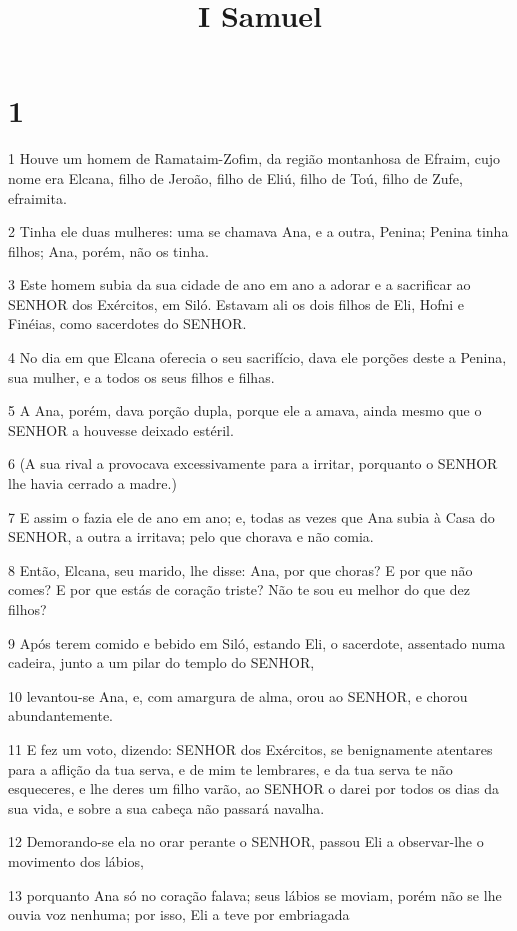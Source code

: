

\title{I Samuel}


\chapter{1}

\par 1 Houve um homem de Ramataim-Zofim, da região montanhosa de Efraim, cujo nome era Elcana, filho de Jeroão, filho de Eliú, filho de Toú, filho de Zufe, efraimita.
\par 2 Tinha ele duas mulheres: uma se chamava Ana, e a outra, Penina; Penina tinha filhos; Ana, porém, não os tinha.
\par 3 Este homem subia da sua cidade de ano em ano a adorar e a sacrificar ao SENHOR dos Exércitos, em Siló. Estavam ali os dois filhos de Eli, Hofni e Finéias, como sacerdotes do SENHOR.
\par 4 No dia em que Elcana oferecia o seu sacrifício, dava ele porções deste a Penina, sua mulher, e a todos os seus filhos e filhas.
\par 5 A Ana, porém, dava porção dupla, porque ele a amava, ainda mesmo que o SENHOR a houvesse deixado estéril.
\par 6 (A sua rival a provocava excessivamente para a irritar, porquanto o SENHOR lhe havia cerrado a madre.)
\par 7 E assim o fazia ele de ano em ano; e, todas as vezes que Ana subia à Casa do SENHOR, a outra a irritava; pelo que chorava e não comia.
\par 8 Então, Elcana, seu marido, lhe disse: Ana, por que choras? E por que não comes? E por que estás de coração triste? Não te sou eu melhor do que dez filhos?
\par 9 Após terem comido e bebido em Siló, estando Eli, o sacerdote, assentado numa cadeira, junto a um pilar do templo do SENHOR,
\par 10 levantou-se Ana, e, com amargura de alma, orou ao SENHOR, e chorou abundantemente.
\par 11 E fez um voto, dizendo: SENHOR dos Exércitos, se benignamente atentares para a aflição da tua serva, e de mim te lembrares, e da tua serva te não esqueceres, e lhe deres um filho varão, ao SENHOR o darei por todos os dias da sua vida, e sobre a sua cabeça não passará navalha.
\par 12 Demorando-se ela no orar perante o SENHOR, passou Eli a observar-lhe o movimento dos lábios,
\par 13 porquanto Ana só no coração falava; seus lábios se moviam, porém não se lhe ouvia voz nenhuma; por isso, Eli a teve por embriagada
